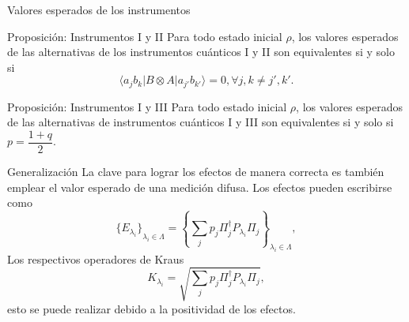 \documentclass[svgnames,12pt,aspectratio=149]{beamer}
\newcommand{\ra}{\rangle}
\newcommand{\la}{\langle}
\newcommand{\permutdagger}[2]{\Pi_{#1}^{\dagger}#2\Pi_{#1}}
\begin{document}
\begin{frame}{Valores esperados de los instrumentos}
  \begin{block}{Proposición: Instrumentos I y II}
    Para todo estado inicial $\rho$, los valores esperados de las alternativas
de los instrumentos cuánticos I y II son equivalentes si y solo si \begin{equation*}\label{eq:Condicion-equivalencia1-2}
    \la a_j
b_k|B\otimes A|a_{j'}b_{k'}\ra=0, \forall j,k\ne j',k'.
\end{equation*}
\end{block}



\begin{block}{Proposición: Instrumentos I y III}
    Para todo estado inicial $\rho$, los valores esperados de las alternativas
de instrumentos cuánticos I y III son equivalentes si y solo si
$p=\dfrac{1+q}{2}$.
\end{block}
\end{frame}


\begin{frame}{Generalización}
  La clave para lograr los efectos de manera correcta es también emplear el valor esperado de una medición difusa. Los efectos pueden escribirse como
  \begin{equation*}
      {\{E_{\lambda_i}\}}_{\lambda_i \in \Lambda}={\left\{\sum_{j} p_{j} \permutdagger{j}{P_{\lambda_i}}\right\}}_{\lambda_i \in \Lambda},
  \end{equation*}  
  Los respectivos operadores de Kraus 
  \begin{equation*}
     K_{\lambda_i}=\sqrt{\sum_{j} p_j \permutdagger{j}{P_{\lambda_i} }},
  \end{equation*} 
  esto se puede realizar debido a la positividad de los efectos.
\end{frame}
\end{document}
